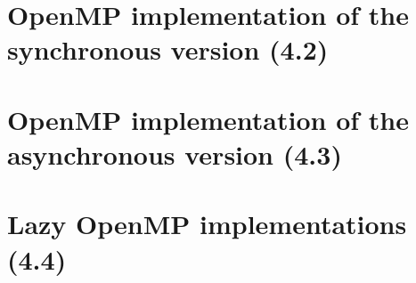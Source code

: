 \documentclass[10pt, a4paper]{article}
\begin{document}

\section{OpenMP implementation of the synchronous version (4.2)}

\section{OpenMP implementation of the asynchronous version (4.3)}

\section{Lazy OpenMP implementations (4.4)}




\end{document}
